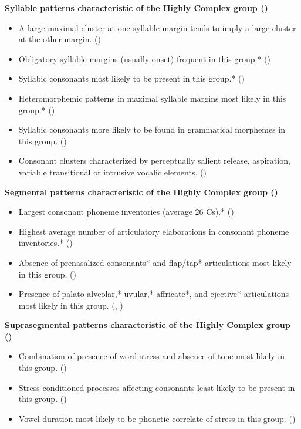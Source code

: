 \textbf{Syllable patterns characteristic of the Highly Complex group ()}

\begin{itemize}
\item A large maximal cluster at one syllable margin tends to imply a large cluster at the other margin. {()}
\item Obligatory syllable margins (usually onset) frequent in this group.* {()}
\item Syllabic consonants most likely to be present in this group.* {()}
\item Heteromorphemic patterns in maximal syllable margins most likely in this group.* {()}
\item Syllabic consonants more likely to be found in grammatical morphemes in this group. {()}
\item Consonant clusters characterized by perceptually salient release, aspiration, variable transitional or intrusive vocalic elements. (\textit{})
\end{itemize}

\textbf{Segmental patterns characteristic of the Highly Complex group ()}

\begin{itemize}
\item Largest consonant phoneme inventories (average 26 Cs).* {()}
\item Highest average number of articulatory elaborations in consonant phoneme inventories.* ()
\item Absence of prenasalized consonants* and flap/tap* articulations most likely in this group. {()}
\item Presence of palato-alveolar,* uvular,* affricate*, and ejective* articulations most likely in this group. {(, )}
\end{itemize}

\textbf{Suprasegmental patterns characteristic of the Highly Complex group ()}

\begin{itemize}
\item Combination of presence of word stress and absence of tone most likely in this group. {()}
\item Stress-conditioned processes affecting consonants least likely to be present in this group. ()
\item Vowel duration most likely to be phonetic correlate of stress in this group. {()}
\end{itemize}

